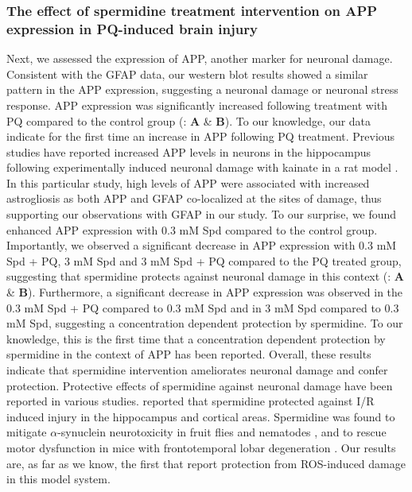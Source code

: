 \subsubsection{The effect of spermidine treatment intervention on APP expression in PQ-induced brain injury}
Next, we assessed the expression of APP, another marker for neuronal damage. Consistent with the GFAP data, our western blot results showed a similar pattern in the APP expression, suggesting a neuronal damage or neuronal stress response. APP expression was significantly increased following treatment with PQ compared to the control group (: \textbf{A} \& \textbf{B}). To our knowledge, our data indicate for the first time an increase in APP following PQ treatment. Previous studies have reported increased APP levels in neurons in the hippocampus following experimentally induced neuronal damage with kainate in a rat model \citep{Siman1989}. In this particular study, high levels of APP were associated with increased astrogliosis as both APP and GFAP co-localized at the sites of damage, thus supporting our observations with GFAP in our study. To our surprise, we found enhanced APP expression with 0.3 mM Spd compared to the control group. Importantly, we observed a significant decrease in APP expression with 0.3 mM Spd + PQ, 3 mM Spd and 3 mM Spd + PQ compared to the PQ treated group, suggesting that spermidine protects against neuronal damage in this context (: \textbf{A} \& \textbf{B}). Furthermore, a significant decrease in APP expression was observed in the 0.3 mM Spd + PQ compared to 0.3 mM Spd and in 3 mM Spd compared to 0.3 mM Spd, suggesting a concentration dependent protection by spermidine. To our knowledge, this is the first time that a concentration dependent protection by spermidine in the context of APP has been reported. Overall, these results indicate that spermidine intervention ameliorates neuronal damage and confer protection. Protective effects of spermidine against neuronal damage have been reported in various studies. \citet{Yang2017} reported that spermidine protected against I/R induced injury in the hippocampus and cortical areas. Spermidine was found to mitigate $\alpha$-synuclein neurotoxicity in fruit flies and nematodes \citep{Buttner2014}, and to rescue motor dysfunction in mice with frontotemporal lobar degeneration \citep{Wang2012}. Our results are, as far as we know, the first that report protection from ROS-induced damage in this model system.

